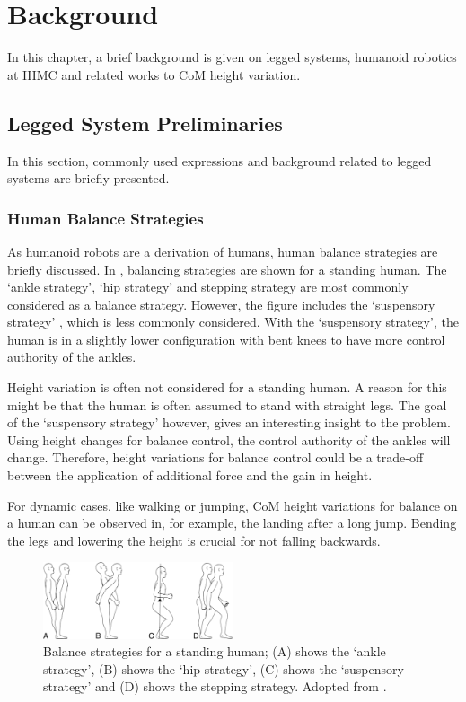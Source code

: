 %
\chapter{Background}\label{chap:background}
In this chapter, a brief background is given on legged systems, humanoid robotics at \ac{IHMC} and related works to \ac{CoM} height variation.
\section{Legged System Preliminaries}
In this section, commonly used expressions and background related to legged systems are briefly presented.
\subsection{Human Balance Strategies}
As humanoid robots are a derivation of humans, human balance strategies are briefly discussed. In , balancing strategies are shown for a standing human. The `ankle strategy', `hip strategy' and stepping strategy are most commonly considered as a balance strategy. However, the figure includes the `suspensory strategy' \cite{hasson1994clinical}, which is less commonly considered. With the `suspensory strategy', the human is in a slightly lower configuration with bent knees to have more control authority of the ankles.

Height variation is often not considered for a standing human. A reason for this might be that the human is often assumed to stand with straight legs. The goal of the `suspensory strategy' however, gives an interesting insight to the problem. Using height changes for balance control, the control authority of the ankles will change. Therefore, height variations for balance control could be a trade-off between the application of additional force and the gain in height. 

For dynamic cases, like walking or jumping, \ac{CoM} height variations for balance on a human can be observed in, for example, the landing after a long jump. Bending the legs and lowering the height is crucial for not falling backwards.
\begin{figure}
\centering
\includegraphics[width=0.5\textwidth]{STYLESTUFF/humanbalance.jpg}
\caption{Balance strategies for a standing human; (A) shows the `ankle strategy', (B) shows the `hip strategy', (C) shows the `suspensory strategy' and (D) shows the stepping strategy. Adopted from \cite{hasson1994clinical}.}
\label{fig:human}
\end{figure}

